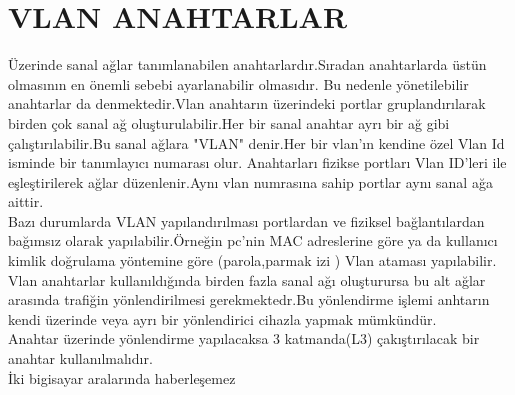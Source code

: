 \section*{VLAN ANAHTARLAR}
Üzerinde sanal ağlar tanımlanabilen anahtarlardır.Sıradan anahtarlarda üstün olmasının en önemli sebebi ayarlanabilir olmasıdır.
Bu nedenle yönetilebilir anahtarlar da denmektedir.Vlan anahtarın üzerindeki portlar gruplandırılarak birden çok sanal ağ oluşturulabilir.Her bir sanal anahtar ayrı bir ağ gibi çalıştırılabilir.Bu sanal ağlara "VLAN" denir.Her bir vlan'ın kendine özel Vlan Id isminde bir tanımlayıcı numarası olur.
Anahtarları fizikse portları Vlan ID'leri ile eşleştirilerek ağlar düzenlenir.Aynı vlan numrasına sahip portlar aynı sanal ağa aittir.\\
Bazı durumlarda VLAN yapılandırılması portlardan ve fiziksel bağlantılardan bağımsız olarak yapılabilir.Örneğin pc'nin MAC adreslerine göre ya da kullanıcı kimlik doğrulama yöntemine göre (parola,parmak izi ) Vlan ataması yapılabilir.\\
Vlan anahtarlar kullanıldığında birden fazla sanal ağı oluşturursa bu alt ağlar arasında trafiğin yönlendirilmesi gerekmektedr.Bu yönlendirme işlemi anhtarın kendi üzerinde veya ayrı bir yönlendirici cihazla yapmak mümkündür.\\
Anahtar üzerinde yönlendirme yapılacaksa 3 katmanda(L3) çakıştırılacak bir anahtar kullanılmalıdır.\\
İki bigisayar aralarında haberleşemez